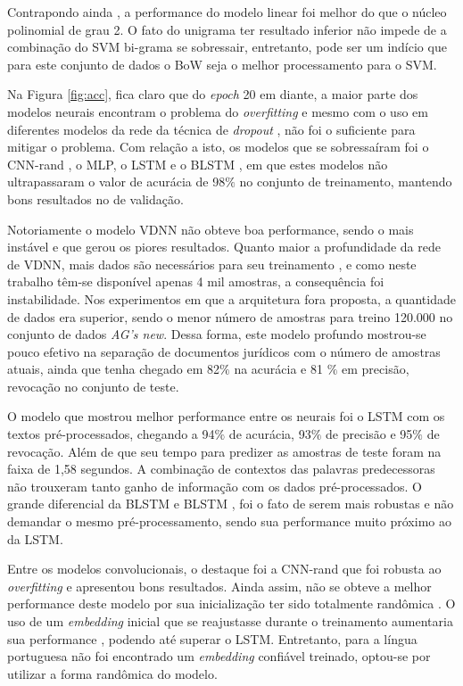 Contrapondo ainda , a performance do modelo linear foi melhor do que o núcleo polinomial de grau 2. O fato do unigrama ter resultado inferior não impede de a combinação do SVM bi-grama \cite{wang_baselines_2012} se sobressair, entretanto, pode ser um indício que para este conjunto de dados o BoW seja o melhor processamento para o SVM.

Na Figura \ref{fig:acc}, fica claro que do \textit{epoch} 20 em diante, a maior parte dos modelos neurais encontram o problema do \textit{overfitting} e mesmo com o uso em diferentes modelos da rede da técnica de \textit{dropout} \cite{srivastava_dropout:_2014}, não foi o suficiente para mitigar o problema. Com relação a isto, os modelos que se sobressaíram foi o CNN-rand \cite{kim_convolutional_2014}, o MLP, o LSTM \cite{hochreiter_long_1997} e o BLSTM \cite{braz_document_2018}, em que estes modelos não ultrapassaram o valor de acurácia de 98$\%$ no conjunto de treinamento, mantendo bons resultados no de validação.

Notoriamente o modelo VDNN \cite{conneau_very_2017} não obteve boa performance, sendo o mais instável e que gerou os piores resultados. Quanto maior a profundidade da rede de VDNN, mais dados são necessários para seu treinamento \cite{conneau_very_2017}, e como neste trabalho têm-se disponível apenas 4 mil amostras, a consequência foi instabilidade. Nos experimentos em que a arquitetura fora proposta, a quantidade de dados era superior, sendo o menor número de amostras para treino 120.000 no conjunto de dados \textit{AG's new}. Dessa forma, este modelo profundo mostrou-se pouco efetivo na separação de documentos jurídicos com o número de amostras atuais, ainda que tenha chegado em 82$\%$ na acurácia e 81 $\%$ em precisão, revocação no conjunto de teste. 

O modelo que mostrou melhor performance entre os neurais foi o LSTM com os textos pré-processados, chegando a 94$\%$ de acurácia, 93$\%$ de precisão e 95$\%$ de revocação. Além de que seu tempo para predizer as amostras de teste foram na faixa de 1,58 segundos. A combinação de contextos das palavras predecessoras \cite{schuster_bidirectional_1997} não trouxeram tanto ganho de informação com os dados pré-processados. O grande diferencial da BLSTM e BLSTM \cite{braz_document_2018}, foi o fato de serem mais robustas e não demandar o mesmo pré-processamento, sendo sua performance muito próximo ao da LSTM.

Entre os modelos convolucionais, o destaque foi a CNN-rand que foi robusta ao \textit{overfitting} e apresentou bons resultados. Ainda assim, não se obteve a melhor performance deste modelo por sua inicialização ter sido totalmente randômica \cite{kim_convolutional_2014}. O uso de um \textit{embedding} inicial que se reajustasse durante o treinamento aumentaria sua performance \cite{kim_convolutional_2014}, podendo até superar o LSTM. Entretanto, para a língua portuguesa não foi encontrado um \textit{embedding} confiável treinado, optou-se por utilizar a forma randômica do modelo.

